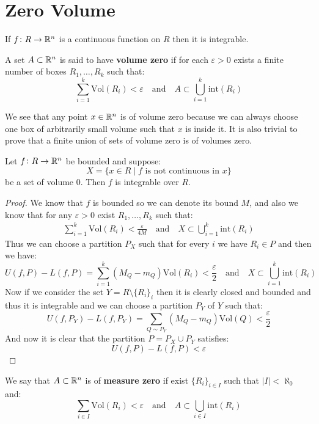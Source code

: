 \documentclass[11pt,a4paper]{article}
\begin{document}
\newpage

\section{Zero Volume}
\begin{remark}
  If $f \colon R \to \mathbb{R}^n$ is a continuous function on $R$
  then it is integrable.
\end{remark}
\begin{definition}
  A set $A \subset \mathbb{R}^n$ is said to have \textbf{volume zero}
  if for each $\varepsilon > 0$ exists a finite number of
  boxes $R_1,\dots,R_k$ such that:
  \[
    \sum_{i=1}^{k}{\mathrm{Vol}(R_i)} < \varepsilon
    \quad \text{and} \quad
    A \subset \bigcup_{i=1}^{k}{\text{int}(R_i)}
  \]
\end{definition}
We see that any point $x \in \mathbb{R}^n$ is of volume zero because
we can always choose one box of arbitrarily small volume such that
$x$ is inside it. It is also trivial to prove that a finite
union of sets of volume zero is of volumes zero.
\begin{theorem}
  Let $f \colon R \to \mathbb{R}^n$ be bounded and suppose:
  \[
    X = \{x \in R \mid \text{$f$ is not continuous in $x$}\}
  \]
  be a set of volume $0$. Then $f$ is integrable over $R$.
\end{theorem}
\begin{proof}
  We know that $f$ is bounded so we can denote its bound $M$,
  and also we know that for any $\varepsilon > 0 $ exist
  $R_1,\dots,R_k$ such that:
  \begin{align*}
    \sum_{i=1}^{k}{\mathrm{Vol}(R_i)} < \frac{\varepsilon}{4M}
    \quad \text{and} \quad
    X \subset \bigcup_{i=1}^{k}{\text{int}(R_i)}
  \end{align*}
  Thus we can choose a partition $P_X$ such that for every $i$
  we have $R_i \in P$ and then we have:
  \[
    U(f,P) - L(f,P) = 
    \sum_{i=1}^{k}{(M_Q-m_Q)\mathrm{Vol}(R_i)} < 
    \frac{\varepsilon}{2}
    \quad \text{and} \quad
    X \subset \bigcup_{i=1}^{k}{\text{int}(R_i)}
  \]
  Now if we consider the set $Y = R \setminus \{R_i\}_i$ then
  it is clearly closed and bounded and thus it is integrable
  and we can choose a partition $P_Y$ of $Y$ such that:
  \[
    U(f,P_Y) - L(f,P_Y) = 
    \sum_{Q \sim P_Y}{(M_Q-m_Q)\mathrm{Vol}(Q)} < 
    \frac{\varepsilon}{2}
  \]
  And now it is clear that the partition $P = P_X \cup P_Y$
  satisfies:
  \[
    U(f,P) - L(f,P) < \varepsilon
  \]
\end{proof}
\begin{definition}
  We say that $A \subset \mathbb{R}^n$ is of \textbf{measure zero} if
  exist $\{R_i\}_{i \in I}$ such that $|I| < \aleph_0$ and:
  \[
    \sum_{i \in I}{\mathrm{Vol}(R_i)} < \varepsilon
    \quad \text{and} \quad
    A \subset \bigcup_{i \in I}{\text{int}(R_i)}
  \]
\end{definition}
\end{document}
